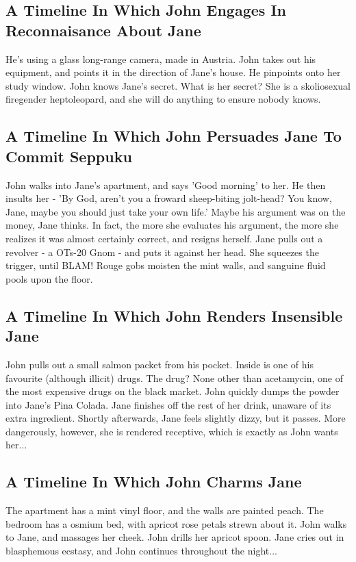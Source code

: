 \documentclass{article}
\begin{document}
\subsection{A Timeline In Which John Engages In Reconnaisance About Jane}


He's using a glass long{-}range camera, made in Austria.
John takes out his equipment, and points it in the direction of Jane's house. He pinpoints onto her study window.
John knows Jane's secret. What is her secret? She is a skoliosexual firegender heptoleopard, and she will do anything to ensure nobody knows.
\subsection{A Timeline In Which John Persuades Jane To Commit Seppuku}


John walks into Jane's apartment, and says 'Good morning' to her.
He then insults her {-} 'By God, aren't you a froward sheep{-}biting jolt{-}head?
You know, Jane, maybe you should just take your own life.'
Maybe his argument was on the money, Jane thinks.
In fact, the more she evaluates his argument, the more she realizes it was almost certainly correct, and resigns herself.
Jane pulls out a revolver {-} a OTs{-}20 Gnom {-} and puts it against her head.
She squeezes the trigger, until BLAM!
Rouge gobs moisten the mint walls, and sanguine fluid pools upon the floor.
\subsection{A Timeline In Which John Renders Insensible Jane}


John pulls out a small salmon packet from his pocket. Inside is one of his favourite (although illicit) drugs.
The drug? None other than acetamycin, one of the most expensive drugs on the black market.
John quickly dumps the powder into Jane's Pina Colada.
Jane finishes off the rest of her drink, unaware of its extra ingredient.
Shortly afterwards, Jane feels slightly dizzy, but it passes.
More dangerously, however, she is rendered receptive, which is exactly as John wants her...
\subsection{A Timeline In Which John Charms Jane}


The apartment has a mint vinyl floor, and the walls are painted peach.
The bedroom has a osmium bed, with apricot rose petals strewn about it.
John walks to Jane, and massages her cheek.
John drills her apricot spoon.
Jane cries out in blasphemous ecstasy, and John continues throughout the night...
\end{document}
